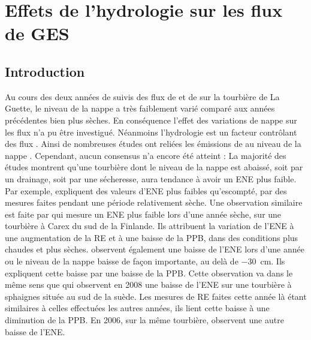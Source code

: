 \singlespacing
\chapter{Effets de l'hydrologie sur les flux de GES}
\label{ch:4}

\minitoc

\newpage
\doublespacing
\section{Introduction}

Au cours des deux années de suivis des flux de \coo et de \chh sur la tourbière de La Guette, le niveau de la nappe a très faiblement varié comparé aux années précédentes bien plus sèches.
En conséquence l'effet des variations de nappe sur les flux n'a pu être investigué.
Néanmoins l'hydrologie est un facteur contrôlant des flux \plop.
Ainsi de nombreuses études ont reliées les émissions de \coo au niveau de la nappe \plop.
Cependant, aucun consensus n'a encore été atteint :
La majorité des études montrent qu'une tourbière dont le niveau de la nappe est abaissé, soit par un drainage, soit par une sécheresse, aura tendance à avoir un ENE plus faible.
Par exemple, \citet{strack2013} expliquent des valeurs d'ENE plus faibles qu'escompté, par des mesures faites pendant une période relativement sèche.
Une observation similaire est faite par \citet{aurela2007} qui mesure un ENE plus faible lors d'une année sèche, sur une tourbière à Carex du sud de la Finlande.
Ils attribuent la variation de l'ENE à une augmentation de la RE et à une baisse de la PPB, dans des conditions plus chaudes et plus sèches.
\citet{peichl2014} observent également une baisse de l'ENE lors d'une année ou le niveau de la nappe baisse de façon importante, au delà de \SI{-30}{\centi\metre}.
Ils expliquent cette baisse par une baisse de la PPB.
Cette observation va dans le même sens que \citet{lund2012} qui observent en 2008 une baisse de l'ENE sur une tourbière à sphaignes située au sud de la suède.
Les mesures de RE faites cette année là étant similaires à celles effectuées les autres années, ils lient cette baisse à une diminution de la PPB.
En 2006, sur la même tourbière, \citet{lund2012} observent une autre baisse de l'ENE.

